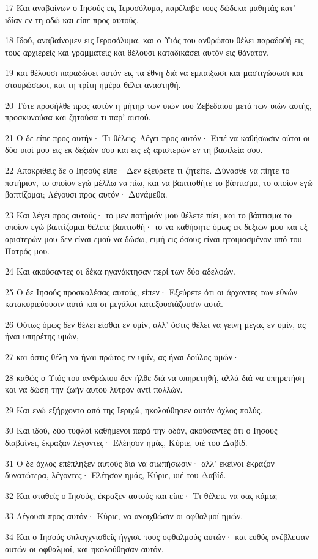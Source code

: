\par 17 Και αναβαίνων ο Ιησούς εις Ιεροσόλυμα, παρέλαβε τους δώδεκα μαθητάς κατ' ιδίαν εν τη οδώ και είπε προς αυτούς.
\par 18 Ιδού, αναβαίνομεν εις Ιεροσόλυμα, και ο Υιός του ανθρώπου θέλει παραδοθή εις τους αρχιερείς και γραμματείς και θέλουσι καταδικάσει αυτόν εις θάνατον,
\par 19 και θέλουσι παραδώσει αυτόν εις τα έθνη διά να εμπαίξωσι και μαστιγώσωσι και σταυρώσωσι, και τη τρίτη ημέρα θέλει αναστηθή.
\par 20 Τότε προσήλθε προς αυτόν η μήτηρ των υιών του Ζεβεδαίου μετά των υιών αυτής, προσκυνούσα και ζητούσα τι παρ' αυτού.
\par 21 Ο δε είπε προς αυτήν· Τι θέλεις; Λέγει προς αυτόν· Ειπέ να καθήσωσιν ούτοι οι δύο υιοί μου εις εκ δεξιών σου και εις εξ αριστερών εν τη βασιλεία σου.
\par 22 Αποκριθείς δε ο Ιησούς είπε· Δεν εξεύρετε τι ζητείτε. Δύνασθε να πίητε το ποτήριον, το οποίον εγώ μέλλω να πίω, και να βαπτισθήτε το βάπτισμα, το οποίον εγώ βαπτίζομαι; Λέγουσι προς αυτόν· Δυνάμεθα.
\par 23 Και λέγει προς αυτούς· το μεν ποτήριόν μου θέλετε πίει; και το βάπτισμα το οποίον εγώ βαπτίζομαι θέλετε βαπτισθή· το να καθήσητε όμως εκ δεξιών μου και εξ αριστερών μου δεν είναι εμού να δώσω, ειμή εις όσους είναι ητοιμασμένον υπό του Πατρός μου.
\par 24 Και ακούσαντες οι δέκα ηγανάκτησαν περί των δύο αδελφών.
\par 25 Ο δε Ιησούς προσκαλέσας αυτούς, είπεν· Εξεύρετε ότι οι άρχοντες των εθνών κατακυριεύουσιν αυτά και οι μεγάλοι κατεξουσιάζουσιν αυτά.
\par 26 Ούτως όμως δεν θέλει είσθαι εν υμίν, αλλ' όστις θέλει να γείνη μέγας εν υμίν, ας ήναι υπηρέτης υμών,
\par 27 και όστις θέλη να ήναι πρώτος εν υμίν, ας ήναι δούλος υμών·
\par 28 καθώς ο Υιός του ανθρώπου δεν ήλθε διά να υπηρετηθή, αλλά διά να υπηρετήση και να δώση την ζωήν αυτού λύτρον αντί πολλών.
\par 29 Και ενώ εξήρχοντο από της Ιεριχώ, ηκολούθησεν αυτόν όχλος πολύς.
\par 30 Και ιδού, δύο τυφλοί καθήμενοι παρά την οδόν, ακούσαντες ότι ο Ιησούς διαβαίνει, έκραξαν λέγοντες· Ελέησον ημάς, Κύριε, υιέ του Δαβίδ.
\par 31 Ο δε όχλος επέπληξεν αυτούς διά να σιωπήσωσιν· αλλ' εκείνοι έκραζον δυνατώτερα, λέγοντες· Ελέησον ημάς, Κύριε, υιέ του Δαβίδ.
\par 32 Και σταθείς ο Ιησούς, έκραξεν αυτούς και είπε· Τι θέλετε να σας κάμω;
\par 33 Λέγουσι προς αυτόν· Κύριε, να ανοιχθώσιν οι οφθαλμοί ημών.
\par 34 Και ο Ιησούς σπλαγχνισθείς ήγγισε τους οφθαλμούς αυτών· και ευθύς ανέβλεψαν αυτών οι οφθαλμοί, και ηκολούθησαν αυτόν.

